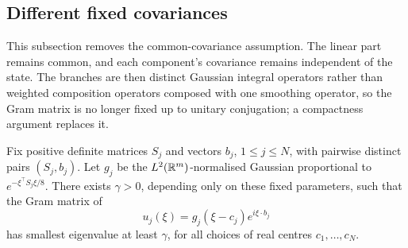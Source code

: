 \subsection{Different fixed covariances}\label{sec:different}

This subsection removes the common-covariance assumption. The linear
part remains common, and each component's covariance remains
independent of the state. The branches are then distinct Gaussian
integral operators rather than weighted composition operators composed
with one smoothing operator, so the Gram matrix is no longer fixed up to
unitary conjugation; a compactness argument replaces it.

\begin{lemma}\label{lem:uniformgram}
Fix positive definite matrices $S_j$ and vectors $b_j$,
$1\le j\le N$, with pairwise distinct pairs $(S_j,b_j)$.
Let $g_j$ be the $L^2(\mathbb R^m)$-normalised Gaussian proportional
to $e^{-\xi^\top S_j\xi/8}$. There exists $\gamma>0$, depending
only on these fixed parameters, such that the Gram matrix of
\[
 u_j(\xi)=g_j(\xi-c_j)e^{i\xi\cdot b_j}
\]
has smallest eigenvalue at least $\gamma$, for all choices
of real centres $c_1,\ldots,c_N$.
\end{lemma}


